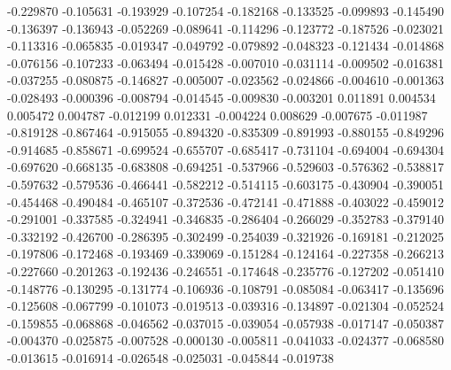 -0.229870
-0.105631
-0.193929
-0.107254
-0.182168
-0.133525
-0.099893
-0.145490
-0.136397
-0.136943
-0.052269
-0.089641
-0.114296
-0.123772
-0.187526
-0.023021
-0.113316
-0.065835
-0.019347
-0.049792
-0.079892
-0.048323
-0.121434
-0.014868
-0.076156
-0.107233
-0.063494
-0.015428
-0.007010
-0.031114
-0.009502
-0.016381
-0.037255
-0.080875
-0.146827
-0.005007
-0.023562
-0.024866
-0.004610
-0.001363
-0.028493
-0.000396
-0.008794
-0.014545
-0.009830
-0.003201
0.011891
0.004534
0.005472
0.004787
-0.012199
0.012331
-0.004224
0.008629
-0.007675
-0.011987
-0.819128
-0.867464
-0.915055
-0.894320
-0.835309
-0.891993
-0.880155
-0.849296
-0.914685
-0.858671
-0.699524
-0.655707
-0.685417
-0.731104
-0.694004
-0.694304
-0.697620
-0.668135
-0.683808
-0.694251
-0.537966
-0.529603
-0.576362
-0.538817
-0.597632
-0.579536
-0.466441
-0.582212
-0.514115
-0.603175
-0.430904
-0.390051
-0.454468
-0.490484
-0.465107
-0.372536
-0.472141
-0.471888
-0.403022
-0.459012
-0.291001
-0.337585
-0.324941
-0.346835
-0.286404
-0.266029
-0.352783
-0.379140
-0.332192
-0.426700
-0.286395
-0.302499
-0.254039
-0.321926
-0.169181
-0.212025
-0.197806
-0.172468
-0.193469
-0.339069
-0.151284
-0.124164
-0.227358
-0.266213
-0.227660
-0.201263
-0.192436
-0.246551
-0.174648
-0.235776
-0.127202
-0.051410
-0.148776
-0.130295
-0.131774
-0.106936
-0.108791
-0.085084
-0.063417
-0.135696
-0.125608
-0.067799
-0.101073
-0.019513
-0.039316
-0.134897
-0.021304
-0.052524
-0.159855
-0.068868
-0.046562
-0.037015
-0.039054
-0.057938
-0.017147
-0.050387
-0.004370
-0.025875
-0.007528
-0.000130
-0.005811
-0.041033
-0.024377
-0.068580
-0.013615
-0.016914
-0.026548
-0.025031
-0.045844
-0.019738
